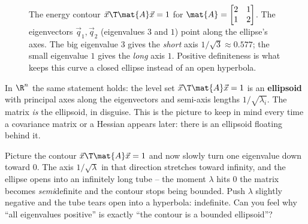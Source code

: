 \begin{figure}[H]
\centering
{}
\caption{The energy contour $\vec{x}\T\mat{A}\vec{x}=1$ for
$\mat{A}=\begin{bmatrix}2&1\\1&2\end{bmatrix}$. The eigenvectors $\vec{q}_1,\vec{q}_2$ (eigenvalues
$3$ and $1$) point along the ellipse's axes. The big eigenvalue $3$ gives the \emph{short} axis
$1/\sqrt3\approx0.577$; the small eigenvalue $1$ gives the \emph{long} axis $1$. Positive
definiteness is what keeps this curve a closed ellipse instead of an open hyperbola.}
\label{ch27:fig-ellipse}
\end{figure}

In $\R^n$ the same statement holds: the level set $\vec{x}\T\mat{A}\vec{x} = 1$ is an
\textbf{ellipsoid} with principal axes along the eigenvectors and semi-axis lengths
$1/\sqrt{\lambda_i}$. The matrix \emph{is} the ellipsoid, in disguise. This is the picture to keep
in mind every time a covariance matrix or a Hessian appears later: there is an ellipsoid floating
behind it.

\begin{walkbox}
Picture the contour $\vec{x}\T\mat{A}\vec{x}=1$ and now slowly turn one eigenvalue down toward $0$.
The axis $1/\sqrt\lambda$ in that direction stretches toward infinity, and the ellipse opens into an
infinitely long tube -- the moment $\lambda$ hits $0$ the matrix becomes \emph{semi}definite and the
contour stops being bounded. Push $\lambda$ slightly negative and the tube tears open into a
hyperbola: indefinite. Can you feel why ``all eigenvalues positive'' is exactly ``the contour is a
bounded ellipsoid''?
\end{walkbox}

